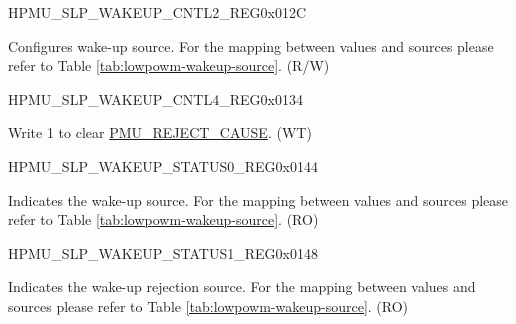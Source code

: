 \begin{register}{H}{PMU\_SLP\_WAKEUP\_CNTL2\_REG}{0x012C}\label{regdesc:PMUSLPWAKEUPCNTL2REG}
%
\regnewline%
\begin{regdesc}\begin{reglist}
\label{fielddesc:PMUWAKEUPENA}\item [PMU\_WAKEUP\_ENA] Configures wake-up source. For the mapping between values and sources please refer to Table \ref{tab:lowpowm-wakeup-source}. (R/W)
\end{reglist}\end{regdesc}
\end{register}


\begin{register}{H}{PMU\_SLP\_WAKEUP\_CNTL4\_REG}{0x0134}\label{regdesc:PMUSLPWAKEUPCNTL4REG}
%
%
\regnewline%
\begin{regdesc}\begin{reglist}
\label{fielddesc:PMUSLPREJECTCAUSECLR}\item [PMU\_SLP\_REJECT\_CAUSE\_CLR] Write 1 to clear \hyperref[fielddesc:PMUREJECTCAUSE]{PMU\_REJECT\_CAUSE}. (WT)
\end{reglist}\end{regdesc}
\end{register}


\begin{register}{H}{PMU\_SLP\_WAKEUP\_STATUS0\_REG}{0x0144}\label{regdesc:PMUSLPWAKEUPSTATUS0REG}
%
\regnewline%
\begin{regdesc}\begin{reglist}
\label{fielddesc:PMUWAKEUPCAUSE}\item [PMU\_WAKEUP\_CAUSE] Indicates the wake-up source. For the mapping between values and sources please refer to Table \ref{tab:lowpowm-wakeup-source}. (RO)
\end{reglist}\end{regdesc}
\end{register}


\begin{register}{H}{PMU\_SLP\_WAKEUP\_STATUS1\_REG}{0x0148}\label{regdesc:PMUSLPWAKEUPSTATUS1REG}
%
\regnewline%
\begin{regdesc}\begin{reglist}
\label{fielddesc:PMUREJECTCAUSE}\item [PMU\_REJECT\_CAUSE] Indicates the wake-up rejection source. For the mapping between values and sources please refer to Table \ref{tab:lowpowm-wakeup-source}. (RO)
\end{reglist}\end{regdesc}
\end{register}


